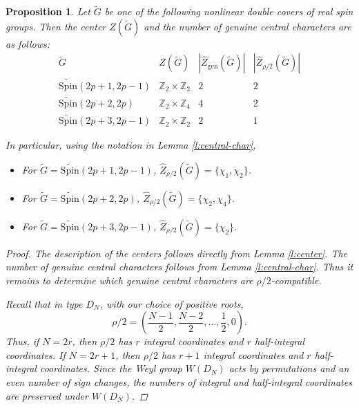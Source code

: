\documentclass{amsart}
\newcommand{\Spin}{{\mathrm{Spin}}}
\newtheorem{prop}[thm]{Proposition}
\theoremstyle{definition}
\newcommand{\tu}{\widetilde}
\begin{document}
\begin{prop}\label{prop:centers-compatible-central-characters}
Let $\widetilde G$ be one of the following nonlinear double covers of real spin groups. Then the center $Z(\widetilde G)$ and the number of genuine central characters are as follows:
\begin{equation*}
\begin{array}{c|c|c|c}
\widetilde G
& Z(\widetilde G)
& |\widehat Z_{\mathrm{gen}}(\widetilde G)|
& |\widehat Z_{\rho/2}(\widetilde G)| \\
\hline
\widetilde{\Spin}(2p+1,2p-1)
& \mathbb{Z}_2\times \mathbb{Z}_2
& 2
& 2 \\
\widetilde{\Spin}(2p+2,2p)
& \mathbb{Z}_2\times \mathbb{Z}_4
& 4
& 2 \\
\widetilde{\Spin}(2p+3,2p-1)
& \mathbb{Z}_2\times \mathbb{Z}_2
& 2
& 1
\end{array}
\end{equation*}

In particular, using the notation in Lemma \ref{l:central-char},
\begin{itemize}
    \item[(1)] For $\tu G=\widetilde{\Spin}(2p+1,2p-1)$,  $\widehat Z_{\rho/2}(\widetilde G)=\{\chi_1, \chi_2\}$.
    \item[(2)] For  $\tu G= \widetilde{\Spin}(2p+2,2p)$,
    $\widehat Z_{\rho/2}(\widetilde G)=\{\chi_2, \chi_4\}$.
    \item[(3)]  For $\tu G= \widetilde{\Spin}(2p+3,2p-1)$, 
        $\widehat Z_{\rho/2}(\widetilde G)=\{\chi_2\}$.
\end{itemize}

\begin{proof}
The description of the centers follows directly from Lemma \ref{l:center}. The number of genuine central characters follows from Lemma \ref{l:central-char}. Thus it remains to determine which genuine central characters are $\rho/2$-compatible.

Recall that in type $D_N$, with our choice of positive roots,
\begin{equation*}
\rho/2=
\left(\frac{N-1}{2},\frac{N-2}{2},\ldots,\frac12,0\right).
\end{equation*}
Thus, if $N=2r$, then $\rho/2$ has $r$ integral coordinates and $r$ half-integral coordinates. If $N=2r+1$, then $\rho/2$ has $r+1$ integral coordinates and $r$ half-integral coordinates. Since the Weyl group $W(D_N)$ acts by permutations and an even number of sign changes, the numbers of integral and half-integral coordinates are preserved under $W(D_N)$.


\end{proof}
\end{prop}
\end{document}
